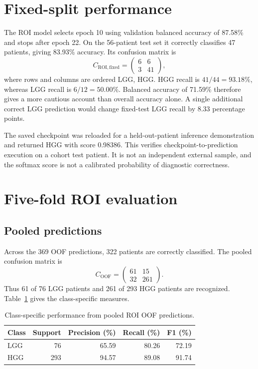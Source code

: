 \documentclass[12pt,a4paper,oneside]{report}
\begin{document}
\section{Fixed-split performance}
The ROI model selects epoch 10 using validation balanced accuracy of 87.58\% and stops after epoch 22. On the 56-patient test set it correctly classifies 47 patients, giving 83.93\% accuracy. Its confusion matrix is
\begin{equation}
C_{\mathrm{ROI,fixed}}=\begin{pmatrix}6&6\\3&41\end{pmatrix},
\end{equation}
where rows and columns are ordered LGG, HGG. HGG recall is $41/44=93.18\%$, whereas LGG recall is $6/12=50.00\%$. Balanced accuracy of 71.59\% therefore gives a more cautious account than overall accuracy alone. A single additional correct LGG prediction would change fixed-test LGG recall by 8.33 percentage points.

The saved checkpoint was reloaded for a held-out-patient inference demonstration and returned HGG with score 0.98386. This verifies checkpoint-to-prediction execution on a cohort test patient. It is not an independent external sample, and the softmax score is not a calibrated probability of diagnostic correctness.

\section{Five-fold ROI evaluation}
\subsection{Pooled predictions}
Across the 369 OOF predictions, 322 patients are correctly classified. The pooled confusion matrix is
\begin{equation}
C_{\mathrm{OOF}}=\begin{pmatrix}61&15\\32&261\end{pmatrix}.
\label{eq:pooledcm}
\end{equation}
Thus 61 of 76 LGG patients and 261 of 293 HGG patients are recognized. Table~\ref{tab:classresults} gives the class-specific measures.

\begin{table}[htbp]
\centering
\caption{Class-specific performance from pooled ROI OOF predictions.}
\label{tab:classresults}
\begin{tabular}{lrrrr}
\toprule
Class & Support & Precision (\%) & Recall (\%) & F1 (\%)\\\midrule
LGG & 76 & 65.59 & 80.26 & 72.19\\
HGG & 293 & 94.57 & 89.08 & 91.74\\\bottomrule
\end{tabular}
\end{table}
\end{document}
